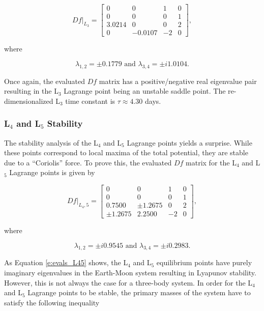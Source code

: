 \documentclass[11pt]{article} %
\begin{document}
\doublespacing
\begin{equation}
	\label{e:df_eval_L3}
	Df|_{L_3} = 
	\begin{bmatrix} 
		0 & 0 & 1  & 0 \\ 
		0 & 0 & 0 & 1 \\
		3.0214 & 0 & 0 & 2 \\
		0 & -0.0107 & -2 & 0
	\end{bmatrix},
\end{equation}
\singlespacing

\noindent
where

\begin{equation}
	\label{e:evals_L3}
	\lambda_{1,2} = \pm 0.1779 \text{ and } \lambda_{3,4} = \pm i1.0104.
\end{equation}

\noindent
Once again, the evaluated $Df$ matrix has a positive/negative real eigenvalue pair resulting in the L$_3$ Lagrange point being an unstable saddle point. The re-dimensionalized L$_3$ time constant is $\tau\approx4.30$ days.

\subsubsection{L$_4$ and L$_5$ Stability}
The stability analysis of the L$_4$ and L$_5$ Lagrange points yields a surprise. While these points correspond to local maxima of the total potential, they are stable due to a ``Coriolis'' force. To prove this, the evaluated $Df$ matrix for the L$_4$ and L$_5$ Lagrange points is given by

\doublespacing
\begin{equation}
	\label{e:df_eval_L45}
	Df|_{L_4,5} = 
	\begin{bmatrix} 
		0 & 0 & 1  & 0 \\ 
		0 & 0 & 0 & 1 \\
		0.7500 & \pm1.2675 & 0 & 2 \\
		\pm1.2675 & 2.2500 & -2 & 0
	\end{bmatrix},
\end{equation}
\singlespacing

\noindent
where

\begin{equation}
	\label{e:evals_L45}
	\lambda_{1,2} = \pm i0.9545 \text{ and } \lambda_{3,4} = \pm i0.2983.
\end{equation}

\noindent
As Equation \ref{e:evals_L45} shows, the L$_4$ and L$_5$ equilibrium points have purely imaginary eigenvalues in the Earth-Moon system resulting in Lyapunov stability. However, this is not always the case for a three-body system. In order for the L$_4$ and L$_5$ Lagrange points to be stable, the primary masses of the system have to satisfy the following inequality \cite{Scheeres2016}
\end{document}
